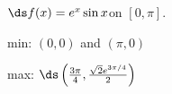 {$\ds f(x) = e^x\sin x$\quad  on \quad $[0,\pi]$.
}
{min: $(0,0)$ and $(\pi,0)$

max: $\ds \left(\frac{3\pi}{4},\frac{\sqrt{2}e^{3\pi/4}}{2}\right)$
}
